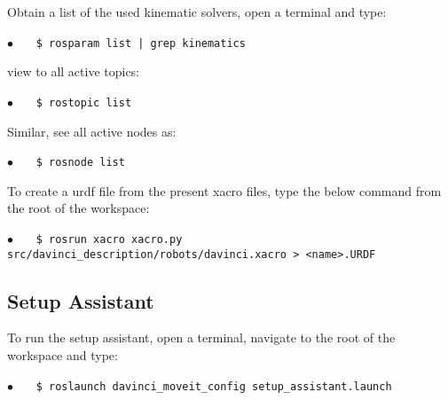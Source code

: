Obtain a list of the used kinematic solvers, open a terminal and type:

\hspace{1cm} \textbf{$\bullet$} \ \ \  \texttt{\$ rosparam list | grep kinematics} \ \ \ {} 

view to all active topics:

\hspace{1cm} \textbf{$\bullet$} \ \ \  \texttt{\$ rostopic list} \ \ \ {} 

Similar, see all active nodes as: 

\hspace{1cm} \textbf{$\bullet$} \ \ \  \texttt{\$ rosnode list} \ \ \ {} 

To create a \gls{urdf} file from the present xacro files, type the below command from the root of the workspace:

\hspace{1cm} \textbf{$\bullet$} \ \ \  \texttt{\$ rosrun xacro xacro.py src/davinci\_description/robots/davinci.xacro > <name>.URDF} %
%
\subsection*{Setup Assistant}
To run the setup assistant, open a terminal, navigate to the root of the workspace and type:

\hspace{1cm} \textbf{$\bullet$} \ \ \  \texttt{\$ roslaunch davinci\_moveit\_config setup\_assistant.launch} \ \ \ {} 

